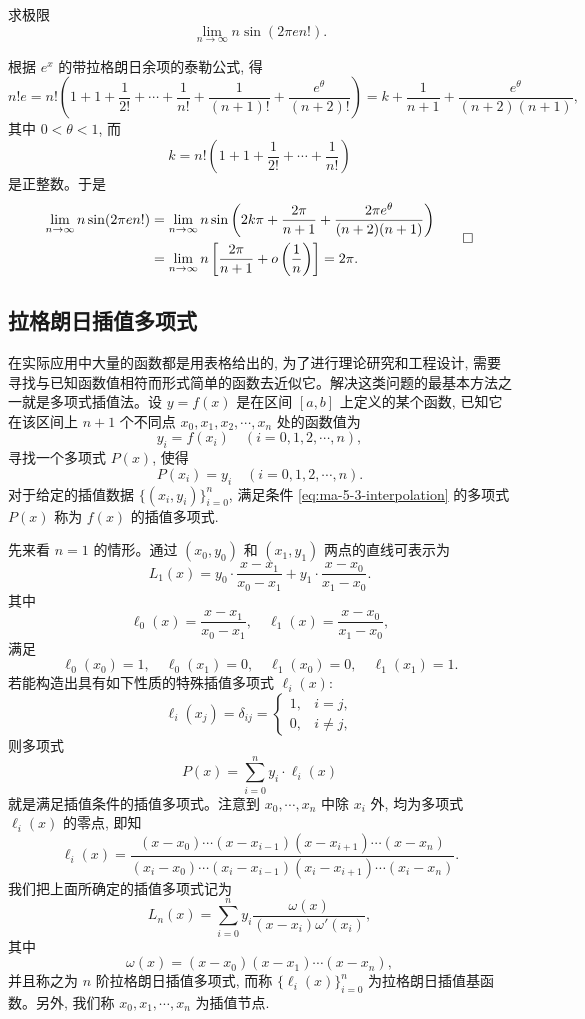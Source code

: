 \begin{example}\label{example:ma-5-3-15}
求极限
\[
  \lim_{n\to\infty}n\sin(2\pi en!).
\]
\end{example}


\begin{solve}
根据 $e^x$ 的带拉格朗日余项的泰勒公式, 得
\[
  n!e
  =
  n!\left(1+1+\frac1{2!}+\cdots+\frac1{n!}+\frac1{(n+1)!}+\frac{e^\theta}{(n+2)!}\right)
  =
  k+\frac1{n+1}+\frac{e^\theta}{(n+2)(n+1)},
\]
其中 $0<\theta<1$, 而
\[
  k=n!\left(1+1+\frac1{2!}+\cdots+\frac1{n!}\right)
\]
是正整数。于是
\[
\begin{aligned}
  \lim_{n\to\infty}n\sin(2\pi en!)
  &=
  \lim_{n\to\infty}
  n\sin\left(2k\pi+\frac{2\pi}{n+1}
  +\frac{2\pi e^\theta}{(n+2)(n+1)}\right) \\
  &=
  \lim_{n\to\infty}
  n\left[\frac{2\pi}{n+1}+o\left(\frac1n\right)\right]
  =
  2\pi.
\end{aligned}
\qedhere
\]
\end{solve}


\subsection{拉格朗日插值多项式}
\label{subsec:ma-5-3-3}

在实际应用中大量的函数都是用表格给出的, 为了进行理论研究和工程设计, 需要寻找与已知函数值相符而形式简单的函数去近似它。解决这类问题的最基本方法之一就是多项式插值法。设 $y=f(x)$ 是在区间 $[a,b]$ 上定义的某个函数, 已知它在该区间上 $n+1$ 个不同点 $x_0,x_1,x_2,\cdots,x_n$ 处的函数值为
\[
  y_i=f(x_i)\quad (i=0,1,2,\cdots,n),
\]
寻找一个多项式 $P(x)$, 使得
\begin{equation}
  P(x_i)=y_i\quad (i=0,1,2,\cdots,n).
  \label{eq:ma-5-3-interpolation}
\end{equation}
对于给定的插值数据 $\{(x_i,y_i)\}_{i=0}^n$, 满足条件 \eqref{eq:ma-5-3-interpolation} 的多项式 $P(x)$ 称为 $f(x)$ 的插值多项式.

先来看 $n=1$ 的情形。通过 $(x_0,y_0)$ 和 $(x_1,y_1)$ 两点的直线可表示为
\[
  L_1(x)=y_0\cdot\frac{x-x_1}{x_0-x_1}+y_1\cdot\frac{x-x_0}{x_1-x_0}.
\]
其中
\[
  \ell_0(x)=\frac{x-x_1}{x_0-x_1},\quad
  \ell_1(x)=\frac{x-x_0}{x_1-x_0},
\]
满足
\[
  \ell_0(x_0)=1,\quad \ell_0(x_1)=0,\quad \ell_1(x_0)=0,\quad \ell_1(x_1)=1.
\]
若能构造出具有如下性质的特殊插值多项式 $\ell_i(x)$:
\[
  \ell_i(x_j)=\delta_{ij}=
  \begin{cases}
    1, & i=j,\\
    0, & i\ne j,
  \end{cases}
\]
则多项式
\[
  P(x)=\sum_{i=0}^n y_i\cdot\ell_i(x)
\]
就是满足插值条件的插值多项式。注意到 $x_0,\cdots,x_n$ 中除 $x_i$ 外, 均为多项式 $\ell_i(x)$ 的零点, 即知
\[
  \ell_i(x)
  =
  \frac{(x-x_0)\cdots(x-x_{i-1})(x-x_{i+1})\cdots(x-x_n)}
       {(x_i-x_0)\cdots(x_i-x_{i-1})(x_i-x_{i+1})\cdots(x_i-x_n)}.
\]
我们把上面所确定的插值多项式记为
\[
  L_n(x)=\sum_{i=0}^n y_i\frac{\omega(x)}{(x-x_i)\omega'(x_i)},
\]
其中
\begin{equation}
  \omega(x)=(x-x_0)(x-x_1)\cdots(x-x_n),
  \label{eq:ma-5-3-3}
\end{equation}
并且称之为 $n$ 阶拉格朗日插值多项式, 而称 $\{\ell_i(x)\}_{i=0}^n$ 为拉格朗日插值基函数。另外, 我们称 $x_0,x_1,\cdots,x_n$ 为插值节点.

